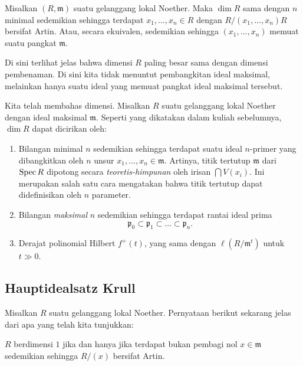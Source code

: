 \begin{corollary} 
Misalkan $(R, \mathfrak{m})$ suatu gelanggang lokal Noether. Maka $\dim R$ sama dengan $n$ minimal
sedemikian sehingga terdapat $x_1, \dots, x_n \in R$ dengan $R/(x_1, \dots, x_n) R$
bersifat Artin. Atau, secara ekuivalen, sedemikian sehingga $(x_1, \dots, x_n)$ memuat suatu pangkat
$\mathfrak{m}$.
\end{corollary}


\begin{remark} 
Di sini terlihat jelas bahwa dimensi $R$ paling besar sama dengan dimensi
pembenaman. Di sini kita tidak menuntut pembangkitan ideal maksimal, melainkan
hanya suatu ideal yang memuat pangkat ideal maksimal tersebut.
\end{remark} 

Kita telah membahas dimensi. Misalkan $R$ suatu gelanggang lokal Noether dengan
ideal maksimal $\mathfrak{m}$. Seperti yang dikatakan dalam kuliah sebelumnya, $\dim R$ dapat dicirikan oleh:
\begin{enumerate}
\item Bilangan minimal $n$ sedemikian sehingga terdapat suatu ideal $n$-primer yang dibangkitkan oleh $n$
unsur $x_1, \dots, x_n \in \mathfrak{m}$. Artinya, titik tertutup
$\mathfrak{m}$ dari
$\operatorname{Spec} R$ dipotong secara \emph{teoretis-himpunan} oleh irisan $\bigcap
V(x_i)$. Ini merupakan salah satu cara mengatakan bahwa titik tertutup dapat didefinisikan oleh $n$
parameter. 
\item Bilangan \emph{maksimal} $n$ sedemikian sehingga terdapat rantai ideal prima
\[ \mathfrak{p}_0 \subset \mathfrak{p}_1 \subset \dots \subset \mathfrak{p}_n. \]
\item Derajat polinomial Hilbert $f^+(t)$, yang sama dengan
$\ell(R/\mathfrak{m}^t)$ untuk $t \gg 0$.
\end{enumerate}


\subsection{Hauptidealsatz Krull}


Misalkan $R$ suatu gelanggang lokal Noether.
Pernyataan berikut sekarang jelas dari apa yang telah kita tunjukkan:

\begin{theorem} \label{hauptv1}
$R$ berdimensi $1$ jika dan hanya jika terdapat bukan pembagi nol $x \in \mathfrak{m}$ sedemikian sehingga
$R/(x)$ bersifat Artin.
\end{theorem} 



